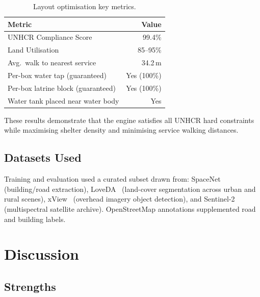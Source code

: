\documentclass[twocolumn]{article}
\begin{document}
\begin{table}[h]
  \caption{Layout optimisation key metrics.}
  \label{tab:layout}
  \centering\small
  \begin{tabular}{@{}lr@{}}
    \toprule
    \textbf{Metric} & \textbf{Value} \\
    \midrule
    UNHCR Compliance Score           & 99.4\% \\
    Land Utilisation                 & 85--95\% \\
    Avg.\ walk to nearest service    & 34.2\,m \\
    Per-box water tap (guaranteed)   & Yes (100\%) \\
    Per-box latrine block (guaranteed)& Yes (100\%) \\
    Water tank placed near water body & Yes \\
    \bottomrule
  \end{tabular}
\end{table}

These results demonstrate that the engine satisfies all UNHCR hard constraints while maximising
shelter density and minimising service walking distances.

\subsection{Datasets Used}

Training and evaluation used a curated subset drawn from:
SpaceNet~\cite{spacenet} (building/road extraction),
LoveDA~\cite{loveda} (land-cover segmentation across urban and rural scenes),
xView~\cite{xview} (overhead imagery object detection), and
Sentinel-2~\cite{sentinel2} (multispectral satellite archive).
OpenStreetMap annotations supplemented road and building labels.

\section{Discussion}
\label{sec:discussion}

\subsection{Strengths}
\end{document}
